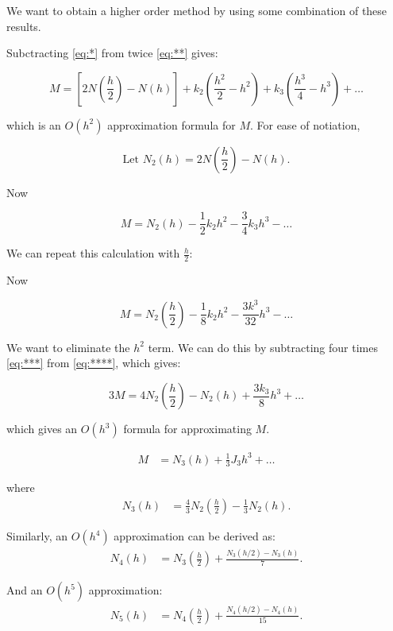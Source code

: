 We want to obtain a higher order method by using some combination of these
results. 

Subctracting \eqref{eq:*} from twice \eqref{eq:**} gives:

\begin{equation}
  M = [2N(\frac{h}{2}) - N(h)] + k_2(\frac{h^2}{2} - h^2) + k_3
  (\frac{h^3}{4}-h^3) + \dots
  \label{eq:?}
\end{equation}

which is an $O(h^2)$ approximation formula for $M$. For ease of notiation, 

\[
\text{Let } N_2(h) = 2N(\frac{h}{2}) - N(h)
.\]

Now 

\begin{equation}
  M = N_2(h) - \frac{1}{2} k_2 h^2 - \frac{3}{4} k_3 h^3 - \dots
  \label{eq:***}
\end{equation}

We can repeat this calculation with $\frac{h}{2}$:

Now 

\begin{equation}
  M = N_2(\frac{h}{2}) -\frac{1}{8} k_2 h^2 - \frac{3k^3}{32}h^3 - \dots
  \label{eq:****}
  \end{equation}

We want to eliminate the $h^2$ term. We can do this by subtracting four times 
\eqref{eq:***} from \eqref{eq:****}, which gives:

\begin{equation}
  3M = 4N_2(\frac{h}{2}) -N_2(h) + \frac{3k_3}{8}h^3 + \dots
  \label{eq:???}
\end{equation}

which gives an $O(h^3)$ formula for approximating $M$. 

\begin{align*}
    M &= N_3(h) + \frac{1}{3} J_3 h^3 + \dots
\end{align*}

where
\begin{align*}
    N_3(h) &= \frac{4}{3} N_2 \left(\frac{h}{2}\right) - \frac{1}{3} N_2(h).
\end{align*}

Similarly, an \( O(h^4) \) approximation can be derived as:
\begin{align*}
    N_4(h) &= N_3 \left(\frac{h}{2}\right) + \frac{N_3(h/2) - N_3(h)}{7}.
\end{align*}

And an \( O(h^5) \) approximation:
\begin{align*}
    N_5(h) &= N_4 \left(\frac{h}{2}\right) + \frac{N_4(h/2) - N_4(h)}{15}.
\end{align*}

